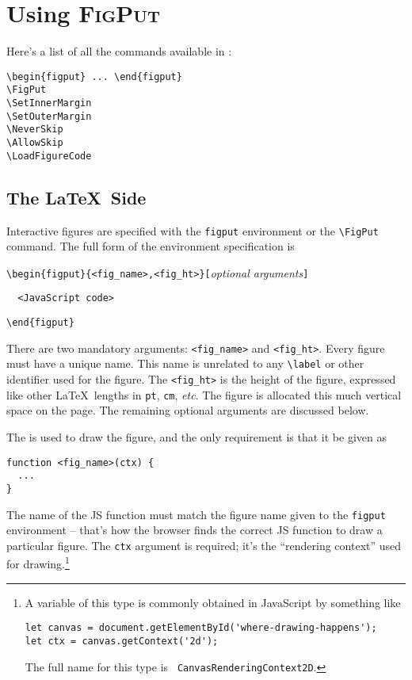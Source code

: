 \documentclass[10pt]{article}
\begin{document}
\section{Using \normalfont\scshape{FigPut}}

Here's a list of all the commands available in \figput:
\begin{verbatim}
\begin{figput} ... \end{figput}
\FigPut
\SetInnerMargin
\SetOuterMargin
\NeverSkip
\AllowSkip
\LoadFigureCode
\end{verbatim}

\subsection{The \LaTeX\ Side}

Interactive figures are specified with the {\tt figput}
environment or the \verb=\FigPut= command. The full form of the
environment specification is
\vskip 0.2cm

\noindent\verb=\begin{figput}{<fig_name>,<fig_ht>}[=\emph{optional arguments}\verb=]=

\noindent\verb=  <JavaScript code>=

\noindent\verb=\end{figput}=
\vskip 0.2cm

\noindent There are two mandatory arguments: \verb=<fig_name>= and
\verb=<fig_ht>=. Every figure must have a unique name. This name is
unrelated to any \verb=\label= or other identifier used for
the figure. The \verb=<fig_ht>= is the height of the figure, expressed
like other \LaTeX\ lengths in {\tt pt}, {\tt cm}, \emph{etc}. The
figure is allocated this much vertical space on the page. The
remaining optional arguments are discussed below.

The {\tt <JavaScript code>} is used to draw the figure, and the only
requirement is that it be given as
\begin{verbatim}
function <fig_name>(ctx) {
  ...
}
\end{verbatim}
The name of the JS function must match the figure name given to the
{\tt figput} environment -- that's how the browser finds the correct
JS function to draw a particular figure. The {\tt ctx} argument
is required; it's the ``rendering context'' used for
drawing.\footnote{\label{page-ctx} A variable of this type is commonly obtained in
JavaScript by something like \vspace{-1.5mm}
\begin{verbatim}
let canvas = document.getElementById('where-drawing-happens');
let ctx = canvas.getContext('2d');
\end{verbatim}
\vspace{-1.5mm} The full name for this type is {\tt
  CanvasRenderingContext2D}.}
\end{document}
